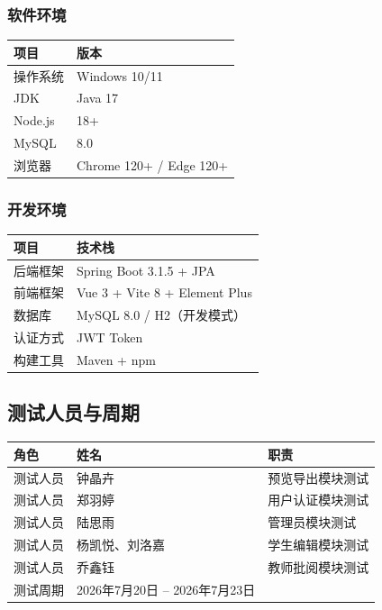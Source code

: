 \documentclass[a4paper,12pt]{article}
\begin{document}
\subsubsection{软件环境}
\begin{center}
\begin{tabular}{|l|l|}
\hline
项目 & 版本 \\
\hline
操作系统 & Windows 10/11 \\
JDK & Java 17 \\
Node.js & 18+ \\
MySQL & 8.0 \\
浏览器 & Chrome 120+ / Edge 120+ \\
\hline
\end{tabular}
\end{center}

\subsubsection{开发环境}
\begin{center}
\begin{tabular}{|l|l|}
\hline
项目 & 技术栈 \\
\hline
后端框架 & Spring Boot 3.1.5 + JPA \\
前端框架 & Vue 3 + Vite 8 + Element Plus \\
数据库 & MySQL 8.0 / H2（开发模式） \\
认证方式 & JWT Token \\
构建工具 & Maven + npm \\
\hline
\end{tabular}
\end{center}

\subsection{测试人员与周期}
\begin{center}
\begin{tabular}{|l|l|l|}
\hline
角色 & 姓名 & 职责 \\
\hline
测试人员 & 钟晶卉 & 预览导出模块测试 \\
测试人员 & 郑羽婷 & 用户认证模块测试 \\
测试人员 & 陆思雨 & 管理员模块测试 \\
测试人员 & 杨凯悦、刘洛嘉 & 学生编辑模块测试 \\
测试人员 & 乔鑫钰 & 教师批阅模块测试 \\
\hline
测试周期 & 2026年7月20日 -- 2026年7月23日 & \\
\hline
\end{tabular}
\end{center}
\end{document}
